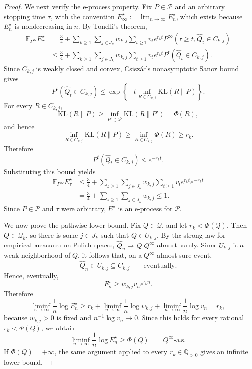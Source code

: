 \documentclass[10pt,a4paper]{amsart}
\newcommand{\KL}{\mathrm{KL}}
\begin{document}
\begin{proof}
We next verify the e-process property. Fix \(P\in\mathcal P\) and an arbitrary stopping time
\(\tau\), with the convention \(E^\star_\infty:=\lim_{n\to\infty}E^\star_n\), which exists because
\(E^\star_n\) is nondecreasing in \(n\). By Tonelli's theorem,
\[
\begin{aligned}
  \mathbb E_{P^\infty}E^\star_\tau
  &=
  \frac34
  +
  \sum_{k\ge1}\sum_{j\in J_k}
  w_{k,j}
  \sum_{t\ge1}
  v_t e^{r_kt}
  P^\infty(\tau\ge t,\widehat Q_t\in C_{k,j})  \\
  &\le
  \frac34
  +
  \sum_{k\ge1}\sum_{j\in J_k}
  w_{k,j}
  \sum_{t\ge1}
  v_t e^{r_kt}
  P^t(\widehat Q_t\in C_{k,j}).
\end{aligned}
\]
Since \(C_{k,j}\) is weakly closed and convex, Csiszár's nonasymptotic Sanov bound gives
\[
  P^t(\widehat Q_t\in C_{k,j})
  \le
  \exp\left\{
    -t\inf_{R\in C_{k,j}}\KL(R\|P)
  \right\}.
\]
For every \(R\in C_{k,j}\),
\[
  \KL(R\|P)\ge \inf_{P'\in\mathcal P}\KL(R\|P')=\Phi(R),
\]
and hence
\[
  \inf_{R\in C_{k,j}}\KL(R\|P)
  \ge
  \inf_{R\in C_{k,j}}\Phi(R)
  \ge r_k.
\]
Therefore
\[
  P^t(\widehat Q_t\in C_{k,j})\le e^{-r_kt}.
\]
Substituting this bound yields
\[
\begin{aligned}
  \mathbb E_{P^\infty}E^\star_\tau
  &\le
  \frac34
  +
  \sum_{k\ge1}\sum_{j\in J_k}
  w_{k,j}
  \sum_{t\ge1}v_t e^{r_kt}e^{-r_kt}  \\
  &=
  \frac34
  +
  \sum_{k\ge1}\sum_{j\in J_k}w_{k,j}
  \le 1.
\end{aligned}
\]
Since \(P\in\mathcal P\) and \(\tau\) were arbitrary, \(E^\star\) is an e-process for
\(\mathcal P\).

We now prove the pathwise lower bound. Fix \(Q\in\mathcal Q\), and let \(r_k<\Phi(Q)\). Then
\(Q\in\mathcal Q_k\), so there is some \(j\in J_k\) such that \(Q\in U_{k,j}\). By the strong law
for empirical measures on Polish spaces, \(\widehat Q_n\Rightarrow Q\) \(Q^\infty\)-almost surely.
Since \(U_{k,j}\) is a weak neighborhood of \(Q\), it follows that, on a \(Q^\infty\)-almost sure event,
\[
  \widehat Q_n\in U_{k,j}\subseteq C_{k,j}
  \qquad\text{eventually}.
\]
Hence, eventually,
\[
  E^\star_n
  \ge
  w_{k,j}v_n e^{r_kn}.
\]
Therefore
\[
  \liminf_{n\to\infty}\frac1n\log E^\star_n
  \ge
  r_k
  +
  \liminf_{n\to\infty}\frac1n\log w_{k,j}
  +
  \liminf_{n\to\infty}\frac1n\log v_n
  =
  r_k,
\]
because \(w_{k,j}>0\) is fixed and \(n^{-1}\log v_n\to0\). Since this holds for every rational
\(r_k<\Phi(Q)\), we obtain
\[
  \liminf_{n\to\infty}\frac1n\log E^\star_n
  \ge
  \Phi(Q)
  \qquad Q^\infty\text{-a.s.}
\]
If \(\Phi(Q)=+\infty\), the same argument applied to every \(r_k\in\mathbb Q_{>0}\) gives an infinite
lower bound.


\end{proof}
\end{document}
